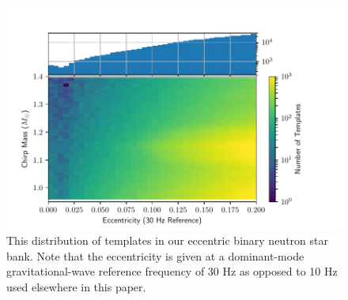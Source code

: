 \begin{figure}[p] 
  \centering
    \includegraphics[width=\textwidth]{Figures/eccentric-search/bank.pdf}
\caption{This distribution of templates in our eccentric binary neutron star bank. Note that the eccentricity
is given at a dominant-mode gravitational-wave reference frequency of 30 Hz as opposed to 10 Hz used elsewhere in this paper.}
\label{fig:bank}
\end{figure}

